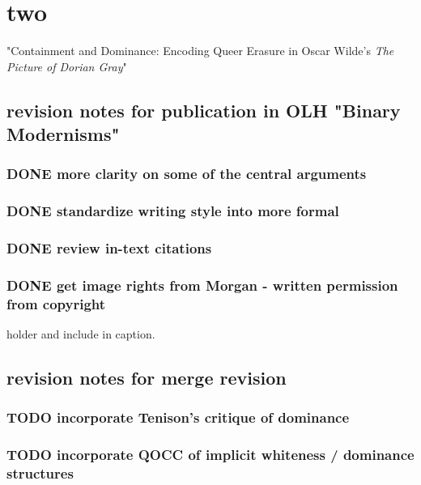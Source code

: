 \documentclass[11pt]{article}
\author{Filipa  Calado}
\date{\today}
\title{}
\begin{document}
\tableofcontents

\section{two}
\label{sec:org8428601}

"Containment and Dominance: Encoding Queer Erasure in Oscar Wilde's
\emph{The Picture of Dorian Gray}"

\subsection{revision notes for publication in OLH "Binary Modernisms"}
\label{sec:orgc9b5088}

\subsubsection{{\bfseries\sffamily DONE} more clarity on some of the central arguments}
\label{sec:org6d29482}
\subsubsection{{\bfseries\sffamily DONE} standardize writing style into more formal}
\label{sec:orgd0b3cb7}
\subsubsection{{\bfseries\sffamily DONE} review in-text citations}
\label{sec:org4a92420}
\subsubsection{{\bfseries\sffamily DONE} get image rights from Morgan - written permission from copyright}
\label{sec:org1a81c06}
holder and include in caption.


\subsection{revision notes for merge revision}
\label{sec:orga74c338}
\subsubsection{{\bfseries\sffamily TODO} incorporate Tenison's critique of dominance}
\label{sec:org7c93d54}
\subsubsection{{\bfseries\sffamily TODO} incorporate QOCC of implicit whiteness / dominance structures}
\label{sec:org74c7f06}
\end{document}
